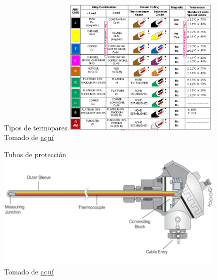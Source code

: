 \documentclass[aspectratio=169]{beamer}
\begin{document}
\begin{frame}{Tipos de termopares}
\centering
    \includegraphics[width=7.5cm]{fig/thermometricscorp.png}
    \\ \tiny{Tomado de \href{https://www.thermometricscorp.com/thermocouple-color-code.html}{aquí}}
\end{frame}

\begin{frame}{Tubos de protección}
\centering
    \includegraphics[width=11cm]{fig/thermocouple-probe-head.png}
    \\ \tiny{Tomado de \href{https://www.tcaus.com.au/thermocouple/index.html}{aquí}}
\end{frame}
\end{document}
